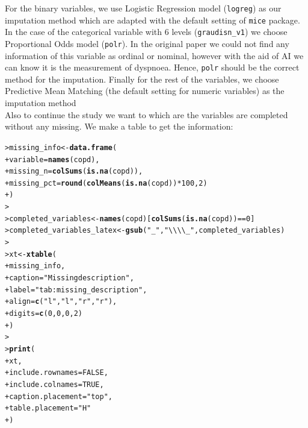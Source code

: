 \documentclass[10pt,a4paper,twoside]{article}\usepackage[]{graphicx}\usepackage[]{xcolor}
\makeatletter
\newcommand{\hlnum}[1]{\textcolor[rgb]{0.686,0.059,0.569}{#1}}%
\newcommand{\hlsng}[1]{\textcolor[rgb]{0.192,0.494,0.8}{#1}}%
\newcommand{\hlopt}[1]{\textcolor[rgb]{0,0,0}{#1}}%
\newcommand{\hldef}[1]{\textcolor[rgb]{0.345,0.345,0.345}{#1}}%
\newcommand{\hlkwb}[1]{\textcolor[rgb]{0.69,0.353,0.396}{#1}}%
\newcommand{\hlkwc}[1]{\textcolor[rgb]{0.333,0.667,0.333}{#1}}%
\newcommand{\hlkwd}[1]{\textcolor[rgb]{0.737,0.353,0.396}{\textbf{#1}}}%
\newenvironment{kframe}{%
 \def\at@end@of@kframe{}%
 \ifinner\ifhmode%
  \def\at@end@of@kframe{\end{minipage}}%
  \begin{minipage}{\columnwidth}%
 \fi\fi%
 \def\FrameCommand##1{\hskip\@totalleftmargin \hskip-\fboxsep
 \colorbox{shadecolor}{##1}\hskip-\fboxsep
     \hskip-\linewidth \hskip-\@totalleftmargin \hskip\columnwidth}%
 \MakeFramed {\advance\hsize-\width
   \@totalleftmargin\z@ \linewidth\hsize
   \@setminipage}}%
 {\par\unskip\endMakeFramed%
 \at@end@of@kframe}
\makeatother
\begin{document}
For the binary variables, we use Logistic Regression model (\texttt{logreg}) as our imputation method which are adapted with the default setting of \texttt{mice} package. In the case of the categorical variable with 6 levels (\texttt{graudisn\_v1}) we choose Proportional Odds model \citep{polr} (\texttt{polr}). In the original paper\citep{basagana2013} we could not find any information of this variable as ordinal or nominal, however with the aid of AI we can know it is the measurement of dyspnoea.\citep{graudisnv1} Hence, \texttt{polr} should be the correct method for the imputation. Finally for the rest of the variables, we choose Predictive Mean Matching (the default setting for numeric variables) as the imputation method\\

Also to continue the study we want to which are the variables are completed without any missing. We make a table to get the information:
\begin{kframe}
\begin{alltt}
\hldef{> }\hldef{missing_info} \hlkwb{<-} \hlkwd{data.frame}\hldef{(}
\hldef{+ }  \hlkwc{variable} \hldef{=} \hlkwd{names}\hldef{(copd),}
\hldef{+ }  \hlkwc{missing_n} \hldef{=} \hlkwd{colSums}\hldef{(}\hlkwd{is.na}\hldef{(copd)),}
\hldef{+ }  \hlkwc{missing_pct} \hldef{=} \hlkwd{round}\hldef{(}\hlkwd{colMeans}\hldef{(}\hlkwd{is.na}\hldef{(copd))} \hlopt{*} \hlnum{100}\hldef{,} \hlnum{2}\hldef{)}
\hldef{+ }\hldef{)}
\hldef{> }
\hldef{> }\hldef{completed_variables} \hlkwb{<-} \hlkwd{names}\hldef{(copd)[}\hlkwd{colSums}\hldef{(}\hlkwd{is.na}\hldef{(copd))} \hlopt{==} \hlnum{0}\hldef{]}
\hldef{> }\hldef{completed_variables_latex} \hlkwb{<-} \hlkwd{gsub}\hldef{(}\hlsng{"_"}\hldef{,} \hlsng{"\textbackslash{}\textbackslash{}\textbackslash{}\textbackslash{}_"}\hldef{, completed_variables)}
\hldef{> }
\hldef{> }\hldef{xt} \hlkwb{<-} \hlkwd{xtable}\hldef{(}
\hldef{+ }  \hldef{missing_info,}
\hldef{+ }  \hlkwc{caption} \hldef{=} \hlsng{"Missing description"}\hldef{,}
\hldef{+ }  \hlkwc{label} \hldef{=} \hlsng{"tab:missing_description"}\hldef{,}
\hldef{+ }  \hlkwc{align} \hldef{=} \hlkwd{c}\hldef{(}\hlsng{"l"}\hldef{,} \hlsng{"l"}\hldef{,} \hlsng{"r"}\hldef{,} \hlsng{"r"}\hldef{),}
\hldef{+ }  \hlkwc{digits} \hldef{=} \hlkwd{c}\hldef{(}\hlnum{0}\hldef{,} \hlnum{0}\hldef{,} \hlnum{0}\hldef{,} \hlnum{2}\hldef{)}
\hldef{+ }\hldef{)}
\hldef{> }
\hldef{> }\hlkwd{print}\hldef{(}
\hldef{+ }  \hldef{xt,}
\hldef{+ }  \hlkwc{include.rownames} \hldef{=} \hlnum{FALSE}\hldef{,}
\hldef{+ }  \hlkwc{include.colnames} \hldef{=} \hlnum{TRUE}\hldef{,}
\hldef{+ }  \hlkwc{caption.placement} \hldef{=} \hlsng{"top"}\hldef{,}
\hldef{+ }  \hlkwc{table.placement} \hldef{=} \hlsng{"H"}
\hldef{+ }\hldef{)}
\end{alltt}
\end{kframe}%
\end{document}
